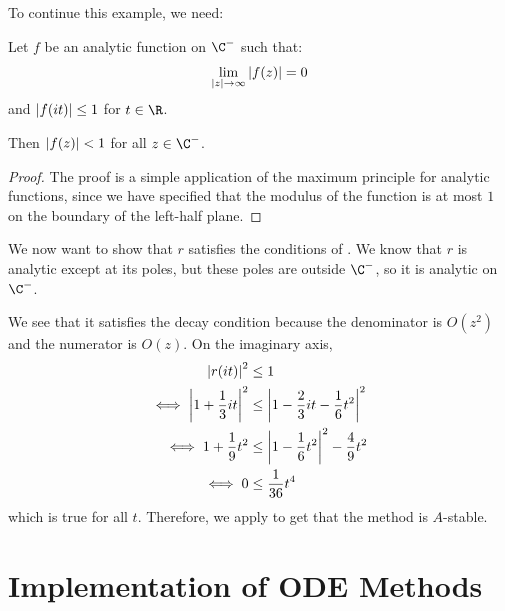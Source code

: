 \documentclass[../Main.tex]{subfiles}
\begin{document}
To continue this example, we need:
\begin{proposition}
    Let $f$ be an analytic function on $\C^-$ such that:
    \begin{equation*}
        \lim_{\left|z\right| \to \infty} \left|f(z)\right| = 0
    \end{equation*}
    and $\left|f(it)\right| \leq 1$ for $t \in \R$.

    Then $\left|f(z)\right| < 1$ for all $z \in \C^-$.
    \label{propMaximumPrinciple}
\end{proposition}
\begin{proof}
    The proof is a simple application of the maximum principle for analytic functions, since we have specified that the modulus of the function is at most $1$ on the boundary of the left-half plane.
\end{proof}
\begin{example}
    We now want to show that $r$ satisfies the conditions of . We know that $r$ is analytic except at its poles, but these poles are outside $\C^-$, so it is analytic on $\C^-$.
    
    We see that it satisfies the decay condition because the denominator is $O(z^2)$ and the numerator is $O(z)$. On the imaginary axis,
    \begin{align*}
        \left|r(it)\right|^2 &\leq 1 \\
        \iff \left|1 + \frac13 i t\right|^2 &\leq \left|1 - \frac23 i t - \frac16 t^2\right|^2 \\
        \iff 1 + \frac19 t^2 &\leq \left|1 - \frac16 t^2\right|^2 - \frac49 t^2 \\
        \iff 0 &\leq \frac{1}{36}t^4
    \end{align*}
    which is true for all $t$. Therefore, we apply  to get that the method is $A$-stable.
\end{example}
\section{Implementation of ODE Methods}
\end{document}
